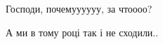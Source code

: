  
 
 
 
 

\qqSecCmt


Господи, почемуууууу, за чтоооо?
🙏🙏🙏🙏🙏🙏🙏🙏


А ми в тому році так і не сходили..

